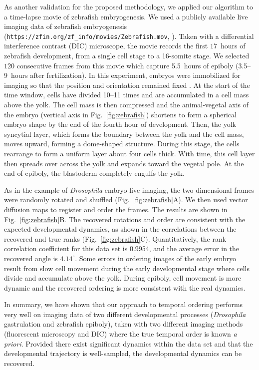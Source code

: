 \documentclass[twocolumn, 10pt]{article}
\newcommand{\fig}[0]{Fig.}
\begin{document}
As another validation for the proposed methodology, we applied our algorithm to a time-lapse movie  of zebrafish embryogenesis.
%
We used a publicly available live imaging data of zebrafish embryogenesis (\texttt{https://zfin.org/zf\_info/movies/Zebrafish.mov}, \citet{karlstrom1996flipbook}).
%
Taken with a differential interference contrast (DIC) microscope, the movie records the first $17$~hours of zebrafish development, from a single cell stage to a 16-somite stage.
%
We selected $120$ consecutive frames from this movie which capture 5.5~hours of epiboly (3.5--9~hours after fertilization).
%
In this experiment, embryos were immobilized for imaging so that the position and orientation remained fixed \citep{kane1996zebrafish}.
%
At the start of the time window, cells have divided 10--11 times and are accumulated in a cell mass above the yolk.
%
The cell mass is then compressed and the animal-vegetal axis of the embryo (vertical axis in \fig~\ref{fig:zebrafish}) shortens to form a spherical embryo shape by the end of the fourth hour of development.
%
Then, the yolk syncytial layer, which forms the boundary between the yolk and the cell mass, moves upward, forming a dome-shaped structure.
%
During this stage, the cells rearrange to form a uniform layer about four cells thick.
%
With time, this cell layer then spreads over across the yolk and expands toward the vegetal pole.
%
At the end of epiboly, the blastoderm completely engulfs the yolk.

As in the example of {\em Drosophila} embryo live imaging, the two-dimensional frames were randomly rotated and shuffled (\fig~\ref{fig:zebrafish}A).
%
We then used vector diffusion maps to register and order the frames.
%
The results are shown in \fig~\ref{fig:zebrafish}B.
%
The recovered rotations and order are consistent with the expected developmental dynamics, as shown in the correlations between the recovered and true ranks (\fig~\ref{fig:zebrafish}C).
%
Quantitatively, the rank correlation coefficient for this data set is 0.9954, and the average error in the recovered angle is $4.14^\circ$.
%
Some errors in ordering images of the early embryo result from slow cell movement during the early developmental stage where cells divide and accumulate above the yolk.
%
During epiboly, cell movement is more dynamic and the recovered ordering is more consistent with the real dynamics.

In summary, we have shown that our approach to temporal ordering performs very well on imaging data of two different developmental processes ({\em Drosophila} gastrulation and zebrafish epiboly), taken with two different imaging methods (fluorescent microscopy and DIC) where the true temporal order is known {\em a priori}.
%
%
Provided there exist significant dynamics within the data set and that the developmental trajectory is well-sampled, the developmental dynamics can be recovered.
\end{document}
